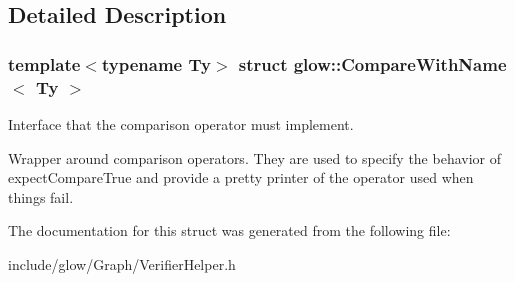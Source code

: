 \subsection{Detailed Description}
\subsubsection*{template$<$typename Ty$>$\newline
struct glow\+::\+Compare\+With\+Name$<$ Ty $>$}

Interface that the comparison operator must implement. 

Wrapper around comparison operators. They are used to specify the behavior of expect\+Compare\+True and provide a pretty printer of the operator used when things fail. 

The documentation for this struct was generated from the following file\+:\begin{DoxyCompactItemize}
\item 
include/glow/\+Graph/Verifier\+Helper.\+h\end{DoxyCompactItemize}
